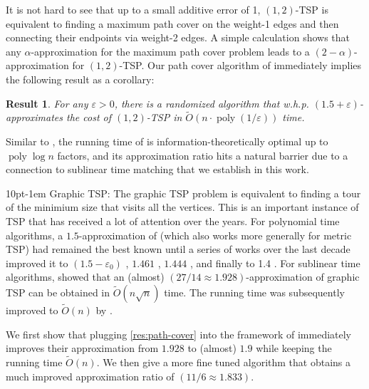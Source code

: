 \documentclass[letterpaper,11pt]{article}
\makeatletter
\renewcommand{\epsilon}{\varepsilon}
\DeclareMathOperator{\poly}{poly}
\newtheorem{result}{Result}
\newenvironment{graytbox}{
\par\addvspace{0.1cm}
\begin{tcolorbox}[width=\textwidth,
                  boxsep=5pt,
                  left=1pt,
                  right=1pt,
                  top=2pt,
                  bottom=2pt,
                  boxrule=0pt,
                  arc=0pt,
                  colback=mylightgray,
                  colframe=black,
                  ]%
}{
\end{tcolorbox}
}
\renewcommand{\paragraph}{%
  \@startsection{paragraph}{4}%
  {\z@}{10pt}{-1em}%
  {\normalfont\normalsize\bfseries}%
}
\makeatother
\begin{document}
It is not hard to see that up to a small additive error of 1, $(1,2)$-TSP is equivalent to finding a maximum path cover on the weight-1 edges and then connecting their endpoints via weight-2 edges. A simple calculation shows that any $\alpha$-approximation for the maximum path cover problem leads to a $(2-\alpha)$-approximation for $(1,2)$-TSP. Our path cover algorithm of  immediately implies the following result as a corollary:
\begin{graytbox}
\begin{result}\label{res:12-TSP}
    For any $\epsilon > 0$, there is a randomized algorithm that w.h.p. $(1.5+\epsilon)$-approximates the cost of $(1,2)$-TSP in $\widetilde{O}(n \cdot \poly(1/\epsilon))$ time.
\end{result}
\end{graytbox}

Similar to , the running time of  is information-theoretically optimal up to $\poly\log n$ factors, and its approximation ratio hits a natural barrier due to a connection to sublinear time matching that we establish in this work.

\paragraph{Graphic TSP:} The graphic TSP problem is equivalent to finding a tour of the minimium size that visits all the vertices. This is an important instance of TSP that has received a lot of attention over the years. For polynomial time algorithms, a $1.5$-approximation of \citet*{christofides1976worst} (which also works more generally for metric TSP) had remained the best known until a series of works over the last decade improved it to $(1.5 - \epsilon_0)$ \cite{GharanSS11}, $1.461$ \cite{MomkeS11}, $1.444$ \cite{Mucha12}, and finally to 1.4 \cite{SeboV14}. For sublinear time algorithms, \citet*{chen2020} showed that an (almost) $(27/14 \approx 1.928)$-approximation of graphic TSP can be obtained in $\widetilde{O}(n \sqrt{n})$ time. The running time was subsequently improved to $\widetilde{O}(n)$ by \citet*{behnezhad2021}.

We first show that plugging \cref{res:path-cover} into the framework of \cite{chen2020} immediately improves their approximation from $1.928$ to (almost) $1.9$ while keeping the running time $\widetilde{O}(n)$. We then give a more fine tuned algorithm that obtains a much improved approximation ratio of $(11/6 \approx 1.833)$.
\end{document}

